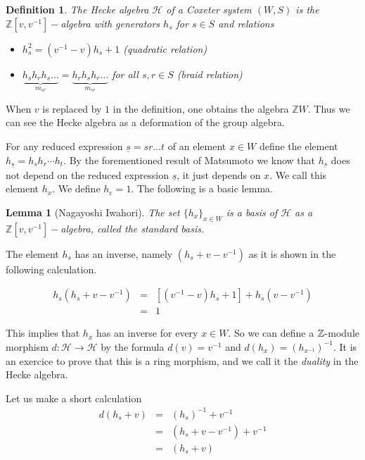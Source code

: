 \documentclass[12pt]{wart}
\newtheorem{defi}{Definition}
\newtheorem{lem}[thm]{Lemma}
\theoremstyle{remark}
\begin{document}
\begin{defi}
The \emph{Hecke algebra} $\mathcal{H}$ of a Coxeter system $(W,S)$ is the $\mathbb{Z}[v,v^{-1}]-$algebra with generators $h_s$ for $s\in S$ and relations 
\begin{itemize}
\item $h_s^2= (v^{-1}-v)h_s +1$ (quadratic relation)
\item  $\underbrace{h_sh_rh_s\ldots}_{m_{sr}}=\underbrace{h_rh_sh_r\ldots}_{m_{sr}}$ for all $s,r\in S$ (braid relation)
\end{itemize}
\end{defi}

 When $v$ is replaced by $1$ in the definition, one obtains the algebra  $\mathbb{Z}W$. Thus we can see the Hecke algebra as a deformation of the group algebra. 

 For any reduced expression $\underline{s}=sr\ldots t$ of an element $x\in W$ define the element $h_{\underline{s}}=h_sh_r\cdots h_t$. By the forementioned result of Matsumoto \cite{Ma} we know that $h_{\underline{s}}$ does not depend on the reduced expression ${\underline{s}}$, it just depends on $x$. 
 We call this element $h_x$. We define $h_{e}=1$.  The following is a basic lemma. 

\begin{lem}[Nagayoshi Iwahori]\label{Iwa}  The set $\{h_x\}_{x\in W}$ is a basis of $\mathcal{H}$ as a $\mathbb{Z}[v,v^{-1}]-$algebra, called the \emph{standard basis}.  
\end{lem}

The element $h_s$ has an inverse, namely $(h_s+v-v^{-1})$ as it is shown in the following calculation.

\begin{eqnarray}
h_s(h_s+v-v^{-1})&=&[(v^{-1}-v)h_s +1]+h_s(v-v^{-1})\nonumber\\
&=&1
\end{eqnarray}

This implies that $h_x$ has an inverse for every $x\in W.$ So we can define a $\mathbb Z$-module morphism  $d:\mathcal{H}\rightarrow \mathcal{H}$ by the formula $d(v)=v^{-1}$ and $d(h_x)=(h_{x^{-1}})^{-1}.$ It is an exercice to prove that this is a ring morphism, and we call it the \emph{duality} in the Hecke algebra. 

Let us make a short calculation 
\begin{eqnarray}\label{bs}
d(h_s+v)&=& (h_s)^{-1} +v^{-1}\nonumber\\
&=&(h_s+v-v^{-1})+v^{-1}\nonumber\\
&=& (h_s+v)
\end{eqnarray}
\end{document}
